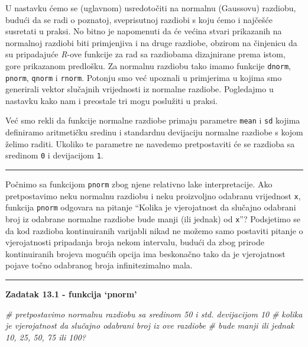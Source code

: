 \documentclass[]{book}
\newenvironment{Shaded}{\begin{snugshade}}{\end{snugshade}}
\newcommand{\CommentTok}[1]{\textcolor[rgb]{0.56,0.35,0.01}{\textit{#1}}}
\theoremstyle{definition}
\theoremstyle{definition}
\theoremstyle{definition}
\theoremstyle{remark}
\begin{document}
U nastavku ćemo se (uglavnom) usredotočiti na normalnu (Gaussovu)
razdiobu, budući da se radi o poznatoj, sveprisutnoj razdiobi s koju
ćemo i najčešće susretati u praksi. No bitno je napomenuti da će većina
stvari prikazanih na normalnoj razdiobi biti primjenjiva i na druge
razdiobe, obzirom na činjenicu da su pripadajuće \emph{R}-ove funkcije
za rad sa razdiobama dizajnirane prema istom, gore prikazanom predlošku.
Za normalnu razdiobu tako imamo funkcije \texttt{dnorm}, \texttt{pnorm},
\texttt{qnorm} i \texttt{rnorm}. Potonju smo već upoznali u primjerima u
kojima smo generirali vektor slučajnih vrijednosti iz normalne razdiobe.
Pogledajmo u nastavku kako nam i preostale tri mogu poslužiti u praksi.

Već smo rekli da funkcije normalne razdiobe primaju parametre
\texttt{mean} i \texttt{sd} kojima definiramo aritmetičku sredinu i
standardnu devijaciju normalne razdiobe s kojom želimo raditi. Ukoliko
te parametre ne navedemo pretpostaviti će se razdioba sa sredinom
\texttt{0} i devijacijom \texttt{1}.

\begin{center}\rule{0.5\linewidth}{\linethickness}\end{center}

Počnimo sa funkcijom \texttt{pnorm} zbog njene relativno lake
interpretacije. Ako pretpostavimo neku normalnu razdiobu i neku
proizvoljno odabranu vrijednost \texttt{x}, funkcija \texttt{pnorm}
odgovara na pitanje ``Kolika je vjerojatnost da slučajno odabrani broj
iz odabrane normalne razdiobe bude manji (ili jednak) od \texttt{x}''?
Podsjetimo se da kod razdioba kontinuiranih varijabli nikad ne možemo
samo postaviti pitanje o vjerojatnosti pripadanja broja nekom intervalu,
budući da zbog prirode kontinuiranih brojeva mogućih opcija ima
beskonačno tako da je vjerojatnost pojave točno odabranog broja
infinitezimalno mala.

\begin{center}\rule{0.5\linewidth}{\linethickness}\end{center}

\textbf{Zadatak 13.1 - funkcija `pnorm'}

\begin{Shaded}
\begin{Highlighting}[]
\CommentTok{# pretpostavimo normalnu razdiobu sa sredinom 50 i std. devijacijom 10}
\CommentTok{# kolika je vjerojatnost da slučajno odabrani broj iz ove razdiobe }
\CommentTok{# bude manji ili jednak 10, 25, 50, 75 ili 100?}
\end{Highlighting}
\end{Shaded}
\end{document}
